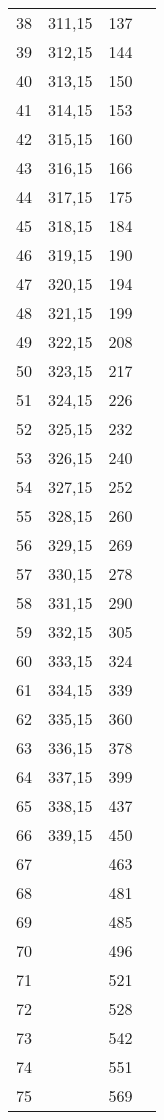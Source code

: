 \begin{table}
\begin{tabular}{cccc}
  38  & 311,15 & 137 &      \\
  39  & 312,15 & 144 &      \\
  40  & 313,15 & 150 &      \\
  41  & 314,15 & 153 &      \\
  42  & 315,15 & 160 &      \\
  43  & 316,15 & 166 &      \\
  44  & 317,15 & 175 &      \\
  45  & 318,15 & 184 &      \\
  46  & 319,15 & 190 &      \\
  47  & 320,15 & 194 &      \\
  48  & 321,15 & 199 &      \\
  49  & 322,15 & 208 &      \\
  50  & 323,15 & 217 &      \\
  51  & 324,15 & 226 &      \\
  52  & 325,15 & 232 &      \\
  53  & 326,15 & 240 &      \\
  54  & 327,15 & 252 &      \\
  55  & 328,15 & 260 &      \\
  56  & 329,15 & 269 &      \\
  57  & 330,15 & 278 &      \\
  58  & 331,15 & 290 &      \\
  59  & 332,15 & 305 &      \\
  60  & 333,15 & 324 &      \\
  61  & 334,15 & 339 &      \\
  62  & 335,15 & 360 &      \\
  63  & 336,15 & 378 &      \\
  64  & 337,15 & 399 &      \\
  65  & 338,15 & 437 &      \\
  66  & 339,15 & 450 &      \\
  67  &    & 463 &      \\
  68  &    & 481 &      \\
  69  &    & 485 &      \\
  70  &    & 496 &      \\
  71  &    & 521 &      \\
  72  &    & 528 &      \\
  73  &    & 542 &      \\
  74  &    & 551 &      \\
  75  &    & 569 &      \\

\end{tabular}
\end{table}
